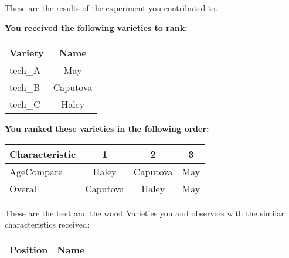 \documentclass[10pt]{article}
\begin{document}
\begin{titlepage}
	These are the results of the experiment you contributed to.

	\begin{flushleft}
		\textbf{You received the following varieties to rank: }\hfill \break
		\begin{tabularx}{\textwidth}{ X | c  }
			\hline
			\textbf{Variety} & \textbf{Name} \\ \hline

			
				tech\_A & May \\ \hline
			
				tech\_B & Caputova \\ \hline
			
				tech\_C & Haley \\ \hline
			


		\end{tabularx}\newline \newline

		\textbf{You ranked these varieties in the following order: }\hfill \break
		\begin{tabularx}{\textwidth}{ X | c | c | c  }
			\hline
			\textbf{Characteristic}
			
				& \textbf{ 1 }
			
				& \textbf{ 2 }
			
				& \textbf{ 3 }
			
			\\ \hline


			
				AgeCompare & Haley  & Caputova  & May  \\ \hline


			
				Overall & Caputova  & Haley  & May  \\ \hline


			

		\end{tabularx}

	\end{flushleft}

	\pagebreak

	\begin{flushleft}
		These are the best and the worst Varieties you and observers with the similar characteristics received:\hfill \break \newline
		\begin{tabularx}{\textwidth}{ X | X  }
			\hline
			\textbf{Position} & \textbf{Name} \\ \hline


\end{tabularx}
\end{flushleft}
\end{titlepage}
\end{document}
